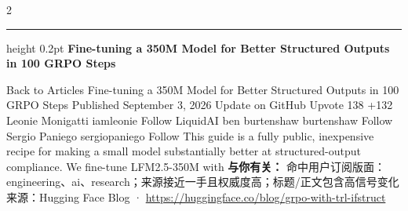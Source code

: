 \documentclass[10.5pt]{ctexart}
\begin{document}
\begin{multicols}{2}
\vspace{2mm}
\hrule height 0.2pt
\vspace{2mm}
{\large\bfseries Fine-tuning a 350M Model for Better Structured Outputs in 100 GRPO Steps}\par
Back to Articles Fine-tuning a 350M Model for Better Structured Outputs in 100 GRPO Steps Published September 3, 2026 Update on GitHub Upvote 138 +132 Leonie Monigatti iamleonie Follow LiquidAI ben burtenshaw burtenshaw Follow Sergio Paniego sergiopaniego Follow This guide is a fully public, inexpensive recipe for making a small model substantially better at structured-output compliance. We fine-tune LFM2.5-350M with
\textbf{与你有关：} 命中用户订阅版面：engineering、ai、research；来源接近一手且权威度高；标题/正文包含高信号变化
{\footnotesize\color{ormuted} 来源：Hugging Face Blog · \url{https://huggingface.co/blog/grpo-with-trl-ifstruct}}
\end{multicols}
\end{document}
